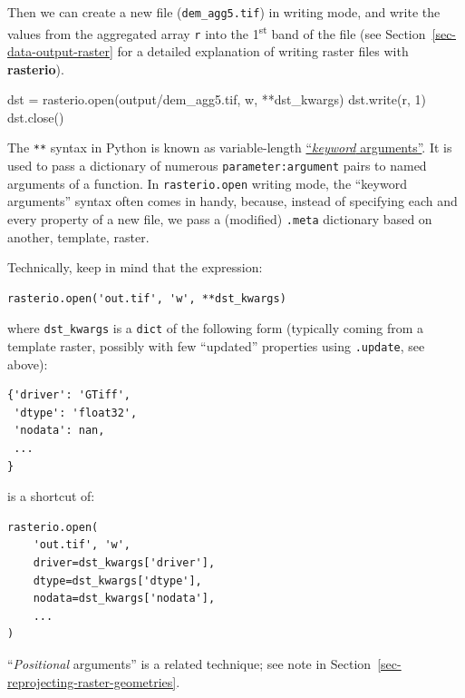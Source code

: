 \documentclass[
  letterpaper,
]{krantz}
\newenvironment{Shaded}{\begin{snugshade}}{\end{snugshade}}
\newcommand{\BuiltInTok}[1]{\textcolor[rgb]{0.00,0.23,0.31}{#1}}
\newcommand{\DecValTok}[1]{\textcolor[rgb]{0.68,0.00,0.00}{#1}}
\newcommand{\NormalTok}[1]{\textcolor[rgb]{0.00,0.23,0.31}{#1}}
\newcommand{\OperatorTok}[1]{\textcolor[rgb]{0.37,0.37,0.37}{#1}}
\newcommand{\StringTok}[1]{\textcolor[rgb]{0.13,0.47,0.30}{#1}}
\begin{document}
Then we can create a new file (\texttt{dem\_agg5.tif}) in writing mode,
and write the values from the aggregated array \texttt{r} into the
1\textsuperscript{st} band of the file (see
Section~\ref{sec-data-output-raster} for a detailed explanation of
writing raster files with \textbf{rasterio}).

\begin{Shaded}
\begin{Highlighting}[]
\NormalTok{dst }\OperatorTok{=}\NormalTok{ rasterio.}\BuiltInTok{open}\NormalTok{(}\StringTok{\textquotesingle{}output/dem\_agg5.tif\textquotesingle{}}\NormalTok{, }\StringTok{\textquotesingle{}w\textquotesingle{}}\NormalTok{, }\OperatorTok{**}\NormalTok{dst\_kwargs)}
\NormalTok{dst.write(r, }\DecValTok{1}\NormalTok{)}
\NormalTok{dst.close()}
\end{Highlighting}
\end{Shaded}

\begin{tcolorbox}[enhanced jigsaw, title=\textcolor{quarto-callout-note-color}{\faInfo}\hspace{0.5em}{Note}, coltitle=black, colbacktitle=quarto-callout-note-color!10!white, breakable, titlerule=0mm, colframe=quarto-callout-note-color-frame, opacitybacktitle=0.6, colback=white, bottomrule=.15mm, left=2mm, leftrule=.75mm, toprule=.15mm, toptitle=1mm, bottomtitle=1mm, arc=.35mm, opacityback=0, rightrule=.15mm]

The \texttt{**} syntax in Python is known as variable-length
\href{https://docs.python.org/3/glossary.html\#term-argument}{``\emph{keyword}
arguments''}. It is used to pass a dictionary of numerous
\texttt{parameter:argument} pairs to named arguments of a function. In
\texttt{rasterio.open} writing mode, the ``keyword arguments'' syntax
often comes in handy, because, instead of specifying each and every
property of a new file, we pass a (modified) \texttt{.meta} dictionary
based on another, template, raster.

Technically, keep in mind that the expression:

\begin{verbatim}
rasterio.open('out.tif', 'w', **dst_kwargs)
\end{verbatim}

where \texttt{dst\_kwargs} is a \texttt{dict} of the following form
(typically coming from a template raster, possibly with few ``updated''
properties using \texttt{.update}, see above):

\begin{verbatim}
{'driver': 'GTiff',
 'dtype': 'float32',
 'nodata': nan,
 ...
}
\end{verbatim}

is a shortcut of:

\begin{verbatim}
rasterio.open(
    'out.tif', 'w', 
    driver=dst_kwargs['driver'], 
    dtype=dst_kwargs['dtype'], 
    nodata=dst_kwargs['nodata'], 
    ...
)
\end{verbatim}

``\emph{Positional} arguments'' is a related technique; see note in
Section~\ref{sec-reprojecting-raster-geometries}.

\end{tcolorbox}
\end{document}
